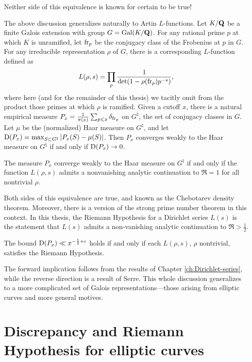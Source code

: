 Neither side of this equivalence is known for certain to be true! 

The above discussion generalizes naturally to Artin $L$-functions. 
Let $K/\mathbf{Q}$ be a finite Galois extension with group $G=\operatorname{Gal}(K/\mathbf{Q})$. For any 
rational prime $p$ at which $K$ is unramified, let $\mathrm{fr}_p$ be the conjugacy 
class of the Frobenius at $p$ in $G$. For any irreducible representation 
$\rho$ of $G$, there is a corresponding $L$-function defined as 
\[
	L(\rho,s) = \prod_p \frac{1}{\det(1-\rho(\mathrm{fr}_p) p^{-s})} ,
\]
where here (and for the remainder of this thesis) we tacitly omit from the 
product those primes at which $\rho$ is ramified. Given a cutoff $x$, there is 
a natural empirical measure 
$P_x = \frac{1}{\pi(x)} \sum_{p\leqslant x} \delta_{\mathrm{fr}_p}$ on 
$G^\natural$, the set of conjugacy classes in $G$. Let $\mu$ be the 
(normalized) Haar measure on $G^\natural$, and let 
$\operatorname{D}(P_x) = \max_{S\subset G^\natural} \left| P_x(S) - \mu(S)\right|$. 
Then $P_x$ converges weakly to the Haar measure on $G^\natural$ if and 
only if $\operatorname{D}(P_x) \to 0$. 

\begin{theorem}
The measure $P_x$ converge weakly to the Haar measure on $G^\natural$ if and 
only if the function $L(\rho,s)$ admits a nonvanishing analytic continuation 
to $\Re = 1$ for all nontrivial $\rho$. 
\end{theorem}

Both sides of this equivalence are true, and known as the Chebotarev density 
theorem. Moreover, there is a version of the strong prime number theorem in 
this context. In this thesis, the Riemann Hypothesis for a Dirichlet series 
$L(s)$ is the statement that $L(s)$ admits a non-vanishing analytic 
continuation to $\Re > \frac 1 2$. 

\begin{theorem}
The bound $\operatorname{D}(P_x) \ll x^{-\frac 1 2+\epsilon}$ holds if and only if each
$L(\rho,s)$, $\rho$ nontrivial, satisfies the Riemann Hypothesis. 
\end{theorem}

The forward implication follows from the results of Chapter 
\ref{ch:Dirichlet-series}, while the reverse direction is a result of Serre. 
This whole discussion generalizes to a more complicated set of Galois 
representations---those arising from elliptic curves and more general motives.  





\section{Discrepancy and Riemann Hypothesis for elliptic curves}

